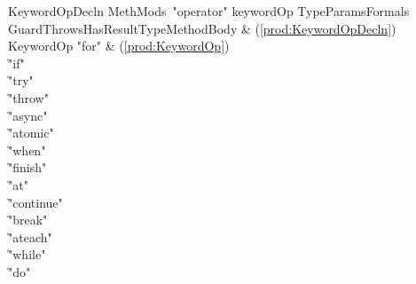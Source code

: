\newcommand{\usrBreak}[3]{\ensuremath{{#1}\texttt{.break}\texttt{[}{#2}\texttt{]}^?~{#3}^?\texttt{;}}}
\newcommand{\libBreak}[3]{\ensuremath{{#1}\texttt{.operator break}\texttt{[}{#2}\texttt{]}^?\texttt{(}{#3}^?\texttt{);}}}

\newcommand{\usrAteach}[5]{\ensuremath{{#1}\texttt{.ateach}\texttt{[}{#2}\texttt{]}^?\texttt{(}({#3}\texttt{~in})^?~{#4}\texttt{)~}{#5}}}
\newcommand{\libAteach}[5]{\ensuremath{{#1}\texttt{.operator~ateach}\texttt{[}{#2}\texttt{]}^?\texttt{(}{#4}\texttt{,}~\texttt{(}{#3}^?\texttt{)}~\texttt{=>}~{#5}\texttt{);}}}

\newcommand{\usrWhile}[4]{\ensuremath{{#1}\texttt{.while}\texttt{[}{#2}\texttt{]}^?\texttt{(}{#3}\texttt{)~}{#4}}}
\newcommand{\libWhile}[4]{\ensuremath{{#1}\texttt{.operator~while}\texttt{[}{#2}\texttt{]}^?\texttt{(}%
    {#3}\texttt{,}~%
    \texttt{()=>}~{#4}\texttt{);}}}

\newcommand{\usrDo}[4]{\ensuremath{{#1}\texttt{.do}\texttt{[}{#2}\texttt{]}^?~{#3}\texttt{~while~(}{#4}\texttt{);}}}
\newcommand{\libDo}[4]{\ensuremath{{#1}\texttt{.operator~do}\texttt{[}{#2}\texttt{]}^?\texttt{(}%
    \texttt{()=>}~{#3}\texttt{,}~%
    {#4}\texttt{);}}}


\begin{bbgrammar}
KeywordOpDecln \: MethMods\ \xcd"operator" keywordOp TypeParams\opt Formals Guard\opt Throws\opt HasResultType\opt MethodBody & (\ref{prod:KeywordOpDecln}) \\
KeywordOp \label{prod:KeywordOp}  \:
       \xcd"for"  & (\ref{prod:KeywordOp}) \\
    \| \xcd"if" \\
    \| \xcd"try" \\
    \| \xcd"throw" \\
    \| \xcd"async" \\
    \| \xcd"atomic" \\
    \| \xcd"when" \\
    \| \xcd"finish" \\
    \| \xcd"at" \\
    \| \xcd"continue" \\
    \| \xcd"break" \\
    \| \xcd"ateach" \\
    \| \xcd"while" \\
    \| \xcd"do" \\

\end{bbgrammar}

